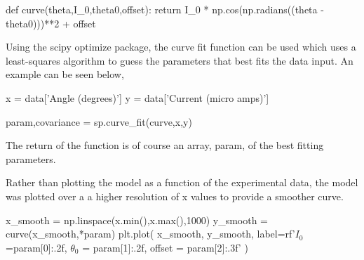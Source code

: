 \documentclass{article}
\begin{document}
\begin{python}
def curve(theta,I_0,theta0,offset):
    return I_0 * np.cos(np.radians((theta - theta0)))**2 + offset
\end{python}

Using the scipy optimize package, the curve fit function can be 
used which uses a least-squares algorithm to guess the parameters 
that best fits the data input. An example can be seen below,

\begin{python}
x = data['Angle (degrees)']
y = data['Current (micro amps)']

param,covariance = sp.curve_fit(curve,x,y)
\end{python}

The return of the function is of course an array, param, of the best 
fitting parameters.

Rather than plotting the model as a function of the experimental data,
the model was plotted over a a higher resolution of x values to provide 
a smoother curve.

\begin{python}
x_smooth = np.linspace(x.min(),x.max(),1000)
y_smooth = curve(x_smooth,*param)
plt.plot(
    x_smooth,
    y_smooth,
    label=rf'$I_0$={param[0]:.2f}, $\theta_0$ = {param[1]:.2f}, offset = {param[2]:.3f}'
)
\end{python}
\end{document}
